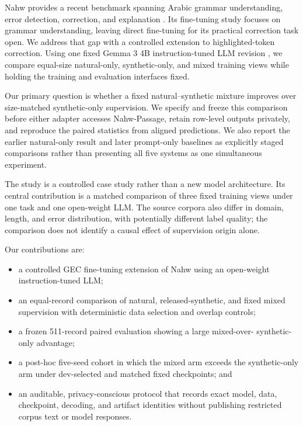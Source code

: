 \documentclass[11pt,a4paper]{article}
\begin{document}
Nahw provides a recent benchmark spanning Arabic grammar understanding, error
detection, correction, and explanation \citep{mubarak-etal-2026-nahw}.  Its
fine-tuning study focuses on grammar understanding, leaving direct
fine-tuning for its practical correction task open.  We address that gap with
a controlled extension to highlighted-token correction.  Using one fixed
Gemma 3 4B instruction-tuned LLM revision \citep{gemma-team-2025-gemma3}, we
compare equal-size
natural-only, synthetic-only, and mixed training views while holding the
training and evaluation interfaces fixed.

Our primary question is whether a fixed natural--synthetic mixture improves
over size-matched synthetic-only supervision.  We specify and freeze this
comparison before either adapter accesses Nahw-Passage, retain row-level outputs
privately, and reproduce the paired statistics from aligned predictions.  We
also report the earlier natural-only result and later prompt-only baselines as
explicitly staged comparisons rather than presenting all five systems as one
simultaneous experiment.

The study is a controlled case study rather than a new model architecture.
Its central contribution is a matched comparison of three fixed training
views under one task and one open-weight LLM.  The source corpora also differ
in domain, length, and error distribution, with potentially different label
quality; the comparison does not identify a causal effect of supervision
origin alone.

Our contributions are:
\begin{itemize}
    \item a controlled GEC fine-tuning extension of Nahw using an open-weight
    instruction-tuned LLM;
    \item an equal-record comparison of natural, released-synthetic, and fixed
    mixed supervision with deterministic data selection and overlap controls;
    \item a frozen 511-record paired evaluation showing a large mixed-over-
    synthetic-only advantage;
    \item a post-hoc five-seed cohort in which the mixed arm exceeds the
    synthetic-only arm under dev-selected and matched fixed checkpoints; and
    \item an auditable, privacy-conscious protocol that records exact model,
    data, checkpoint, decoding, and artifact identities without publishing
    restricted corpus text or model responses.
\end{itemize}
\end{document}
